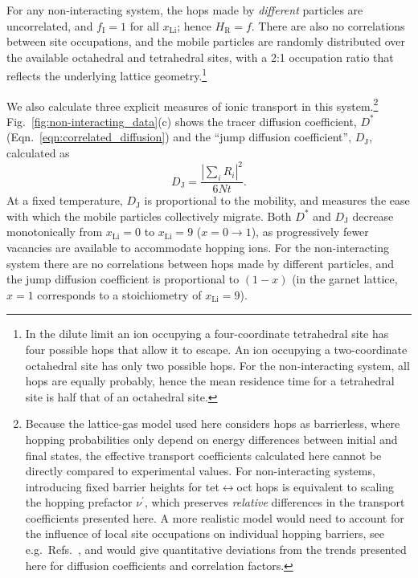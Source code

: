 \documentclass[aps,prb,twocolumn,superscriptaddress,reprint]{revtex4-1}
\newcommand{\xLi}{x_\m{Li}}
\newcommand{\m}[1]{\mathrm{#1}}
\begin{document}
For any non-interacting system, the hops made by \emph{different} particles are uncorrelated, and $f_\mathrm{I}=1$ for all $\xLi$; hence $H_\m{R}=f$. 
There are also no correlations between site occupations, and the mobile particles are randomly distributed over the available octahedral and tetrahedral sites, with a 2:1 occupation ratio that reflects the underlying lattice geometry.\footnote{In the dilute limit an ion occupying a four-coordinate tetrahedral site has four possible hops that allow it to escape. An ion occupying a two-coordinate octahedral site has only two possible hops. For the non-interacting system, all hops are equally probably, hence the mean residence time for a tetrahedral site is half that of an octahedral site.}

We also calculate three explicit measures of ionic transport in this system.\footnote{Because the lattice-gas model used here considers hops as barrierless, where hopping probabilities only depend on energy differences between initial and final states, the effective transport coefficients calculated here cannot be directly compared to experimental values. For non-interacting systems, introducing fixed barrier heights for tet$\leftrightarrow$oct hops is equivalent to scaling the hopping prefactor $\nu^\prime$, which preserves \emph{relative} differences in the transport coefficients presented here. 
A more realistic model would need to account for the influence of local site occupations on individual hopping barriers, see e.g.\ Refs.~, and would give quantitative deviations from the trends presented here for diffusion coefficients and correlation factors.} Fig.~\ref{fig:non-interacting_data}(c) shows the tracer diffusion coefficient, $D^*$ (Eqn.~\ref{eqn:correlated_diffusion}) and the ``jump diffusion coefficient'', $D_\m{J}$,\cite{VanDerVenEtAl_AccChemRes2013} calculated as
\begin{equation}
  D_\m{J}=\frac{\left|\sum_iR_i\right|^2}{6Nt}.
\end{equation}
At a fixed temperature, $D_\m{J}$ is proportional to the mobility, and measures the ease with which the mobile particles collectively migrate. 
Both $D^*$ and $D_\m{J}$ decrease monotonically from $\xLi=0$ to $\xLi=9$ ($x=0\to1$), as progressively fewer vacancies are available to accommodate hopping ions. 
For the non-interacting system there are no correlations between hops made by different particles, and the jump diffusion coefficient is proportional to $(1-x)$ (in the garnet lattice, $x=1$ corresponds to a stoichiometry of $\xLi=9$).\cite{Kutner_PhysLett1981,VanDerVenEtAl_AccChemRes2013}
\end{document}

